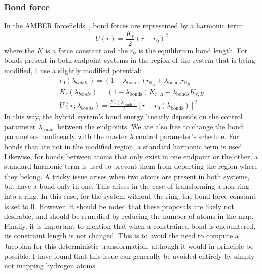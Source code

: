\subsubsection{Bond force}
%
In the AMBER forcefields~\cite{Ponder2003}, bond forces are represented by a harmonic term:
%
\begin{equation} \label{eq:bondforce}
    U(r) = \frac{K_r}{2}(r - r_0)^2
\end{equation}
\noindent where the $K$ is a force constant and the $r_0$ is the equilibrium bond length. 
%
For bonds present in both endpoint systems in the region of the system that is being modified, I use a slightly modified potential:
\begin{eqnarray} \label{harmonic_alchemical}
    r_0 (\lambda_{bonds}) = (1 - \lambda_\mathrm{bonds}) r_{0_A} + \lambda_\mathrm{bonds} r_{0_B} \\
    K_r (\lambda_{bonds}) = (1 - \lambda_\mathrm{bonds}) K_{r,A} + \lambda_\mathrm{bonds} K_{r,B} \\
    U(r; \lambda_{bonds}) = \frac{K_{r} (\lambda_\mathrm{bonds})} {2} \left[ r - r_0(\lambda_\mathrm{bonds}) \right]^2
\end{eqnarray}
%
\noindent In this way, the hybrid system's bond energy linearly depends on the control parameter $\lambda_{bonds}$ between the endpoints.
%
We are also free to change the bond parameters nonlinearly with the master $\lambda$ control parameter's schedule.
%
For bonds that are not in the modified region, a standard harmonic term is used. 
%
Likewise, for bonds between atoms that only exist in one endpoint or the other, a standard harmonic term is used to prevent them from departing the region where they belong.
%
A tricky issue arises when two atoms are present in both systems, but have a bond only in one.
%
This arises in the case of transforming a non-ring into a ring.
%
In this case, for the system without the ring, the bond force constant is set to 0. 
%
However, it should be noted that these proposals are likely not desirable, and should be remedied by reducing the number of atoms in the map.
%
Finally, it is important to mention that when a constrained bond is encountered, its constraint length is not changed.
%
This is to avoid the need to compute a Jacobian for this deterministic transformation, although it would in principle be possible.
%
I have found that this issue can generally be avoided entirely by simply not mapping hydrogen atoms.
%
